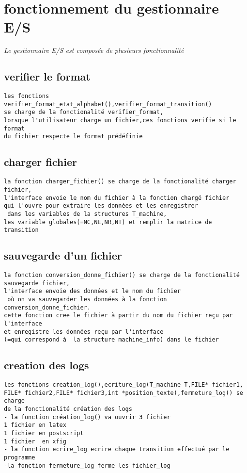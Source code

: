\documentclass{article}
\begin{document}
\section{fonctionnement du gestionnaire E/S}

\textit{Le gestionnaire E/S est composée de plusieurs fonctionnalité}

\subsection{verifier le format}
\begin{verbatim}
les fonctions verifier_format_etat_alphabet(),verifier_format_transition()
se charge de la fonctionalité verifier_format,
lorsque l'utilisateur charge un fichier,ces fonctions verifie si le format 
du fichier respecte le format prédéfinie 
\end{verbatim}

\subsection{charger fichier}
\begin{verbatim}
la fonction charger_fichier() se charge de la fonctionalité charger fichier,
l'interface envoie le nom du fichier à la fonction chargé fichier
qui l'ouvre pour extraire les données et les enregistrer 
 dans les variables de la structures T_machine,
les variable globales(=NC,NE,NR,NT) et remplir la matrice de transition
\end{verbatim}

\subsection{sauvegarde d'un fichier}
\begin{verbatim}
la fonction conversion_donne_fichier() se charge de la fonctionalité 
sauvegarde fichier,
l'interface envoie des données et le nom du fichier
 où on va sauvegarder les données à la fonction conversion_donne_fichier.
cette fonction cree le fichier à partir du nom du fichier reçu par l'interface 
et enregistre les données reçu par l'interface
(=qui correspond à  la structure machine_info) dans le fichier
\end{verbatim}
\subsection{creation des logs}
\begin{verbatim}
les fonctions creation_log(),ecriture_log(T_machine T,FILE* fichier1,
FILE* fichier2,FILE* fichier3,int *position_texte),fermeture_log() se charge
de la fonctionalité création des logs
- la fonction création_log() va ouvrir 3 fichier
1 fichier en latex
1 fichier en postscript
1 fichier  en xfig
- la fonction ecrire_log ecrire chaque transition effectué par le programme
-la fonction fermeture_log ferme les fichier_log

\end{verbatim}
\end{document}
